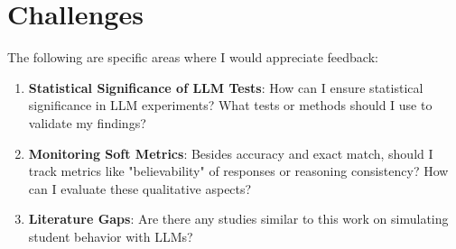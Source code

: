 \documentclass[
    a4paper, %
    10pt, %
    twoside %
]{LTJournalArticle}
\begin{document}
\section{Challenges}

The following are specific areas where I would appreciate feedback:

\begin{enumerate}
    \item \textbf{Statistical Significance of LLM Tests}: How can I ensure statistical significance in LLM experiments? What tests or methods should I use to validate my findings?
    \item \textbf{Monitoring Soft Metrics}: Besides accuracy and exact match, should I track metrics like "believability" of responses or reasoning consistency? How can I evaluate these qualitative aspects?
    \item \textbf{Literature Gaps}: Are there any studies similar to this work on simulating student behavior with LLMs?
\end{enumerate}
\end{document}
